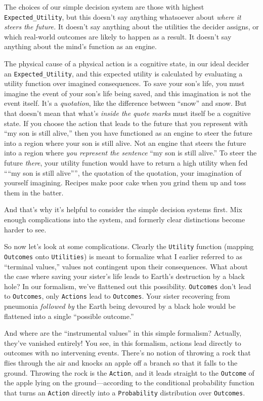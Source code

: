  The choices of our simple decision system are those with highest
\texttt{Expected\_Utility}, but this doesn't say anything
whatsoever about \textit{where it steers the future.} It
doesn't say anything about the utilities the decider
assigns, or which real-world outcomes are likely to happen as a result.
It doesn't say anything about the
mind's function as an engine.


 The physical cause of a physical action is a cognitive state, in
our ideal decider an \texttt{Expected\_Utility}, and this expected utility is
calculated by evaluating a utility function over imagined consequences.
To save your son's life, you must imagine the event of
your son's life being saved, and this imagination is
not the event itself. It's a \textit{quotation}, like
the difference between ``snow'' and
snow. But that doesn't mean that what's
\textit{inside the quote marks} must itself be a cognitive state. If
you choose the action that leads to the future that you represent with
``my son is still alive,'' then you
have functioned as an engine to steer the future into a region where
your son is still alive. Not an engine that steers the future into a
region where \textit{you represent the sentence} ``my
son is still alive.'' To steer the future
\textit{there}, your utility function would have to return a high
utility when fed ````my son is still
alive'''', the quotation of the
quotation, your imagination of yourself imagining. Recipes make poor
cake when you grind them up and toss them in the batter.


 And that's why it's helpful to
consider the simple decision systems first. Mix enough complications
into the system, and formerly clear distinctions become harder to see.


 So now let's look at some complications. Clearly
the \texttt{Utility} function (mapping \texttt{Outcomes} onto \texttt{Utilities}) is meant to
formalize what I earlier referred to as ``terminal
values,'' values not contingent upon their
consequences. What about the case where saving your
sister's life leads to Earth's
destruction by a black hole? In our formalism, we've
flattened out this possibility. \texttt{Outcomes} don't lead to
\texttt{Outcomes}, only \texttt{Actions} lead to \texttt{Outcomes}. Your sister recovering from
pneumonia \textit{followed by} the Earth being devoured by a black hole
would be flattened into a single ``possible
outcome.''


 And where are the ``instrumental
values'' in this simple formalism? Actually,
they've vanished entirely! You see, in this formalism,
actions lead directly to outcomes with no intervening events.
There's no notion of throwing a rock that flies through
the air and knocks an apple off a branch so that it falls to the
ground. Throwing the rock is the \texttt{Action}, and it leads straight to the
\texttt{Outcome} of the apple lying on the ground---according to the conditional
probability function that turns an \texttt{Action} directly into a \texttt{Probability}
distribution over \texttt{Outcomes}.


